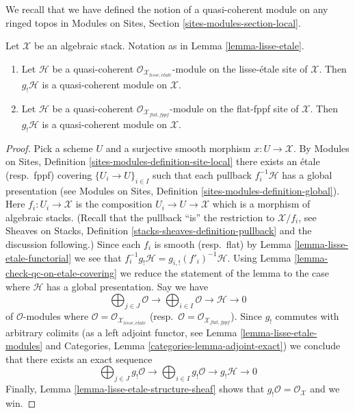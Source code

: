 \noindent
We recall that we have defined the notion of a quasi-coherent module on
any ringed topos in
Modules on Sites, Section \ref{sites-modules-section-local}.

\begin{lemma}
\label{lemma-shriek-quasi-coherent}
Let $\mathcal{X}$ be an algebraic stack. Notation as in
Lemma \ref{lemma-lisse-etale}.
\begin{enumerate}
\item Let $\mathcal{H}$ be a quasi-coherent
$\mathcal{O}_{\mathcal{X}_{lisse,\acute{e}tale}}$-module 
on the lisse-\'etale site of $\mathcal{X}$. Then $g_!\mathcal{H}$ is a
quasi-coherent module on $\mathcal{X}$.
\item Let $\mathcal{H}$ be a quasi-coherent
$\mathcal{O}_{\mathcal{X}_{flat,fppf}}$-module 
on the flat-fppf site of $\mathcal{X}$. Then $g_!\mathcal{H}$ is a
quasi-coherent module on $\mathcal{X}$.
\end{enumerate}
\end{lemma}

\begin{proof}
Pick a scheme $U$ and a surjective smooth morphism $x : U \to \mathcal{X}$.
By
Modules on Sites, Definition \ref{sites-modules-definition-site-local}
there exists an \'etale (resp.\ fppf) covering
$\{U_i \to U\}_{i \in I}$ such that each pullback $f_i^{-1}\mathcal{H}$
has a global presentation (see
Modules on Sites, Definition \ref{sites-modules-definition-global}).
Here $f_i : U_i \to \mathcal{X}$ is the composition
$U_i \to U \to \mathcal{X}$ which is a morphism of algebraic stacks.
(Recall that the pullback ``is'' the restriction to $\mathcal{X}/f_i$, see
Sheaves on Stacks, Definition \ref{stacks-sheaves-definition-pullback}
and the discussion following.) Since each $f_i$ is smooth (resp.\ flat) by
Lemma \ref{lemma-lisse-etale-functorial}
we see that $f_i^{-1}g_!\mathcal{H} = g_{i, !}(f'_i)^{-1}\mathcal{H}$.
Using Lemma \ref{lemma-check-qc-on-etale-covering}
we reduce the statement of the lemma to the case where $\mathcal{H}$
has a global presentation. Say we have
$$
\bigoplus\nolimits_{j \in J} \mathcal{O} \longrightarrow
\bigoplus\nolimits_{i \in I} \mathcal{O} \longrightarrow
\mathcal{H} \longrightarrow 0
$$
of $\mathcal{O}$-modules where
$\mathcal{O} = \mathcal{O}_{\mathcal{X}_{lisse,\acute{e}tale}}$
(resp.\ $\mathcal{O} = \mathcal{O}_{\mathcal{X}_{flat,fppf}}$).
Since $g_!$ commutes with arbitrary colimits (as a left adjoint functor, see
Lemma \ref{lemma-lisse-etale-modules} and
Categories, Lemma \ref{categories-lemma-adjoint-exact})
we conclude that there exists an exact sequence
$$
\bigoplus\nolimits_{j \in J} g_!\mathcal{O} \longrightarrow
\bigoplus\nolimits_{i \in I} g_!\mathcal{O} \longrightarrow
g_!\mathcal{H} \longrightarrow 0
$$
Finally, Lemma \ref{lemma-lisse-etale-structure-sheaf}
shows that $g_!\mathcal{O} = \mathcal{O}_\mathcal{X}$
and we win.
\end{proof}

